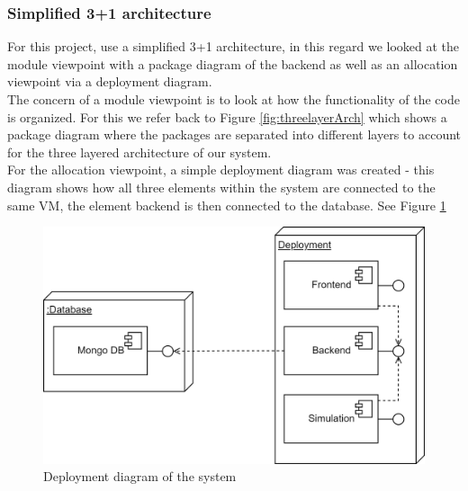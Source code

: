 \subsubsection{Simplified 3+1 architecture}
For this project, use a simplified 3+1 architecture, in this regard we looked at the module viewpoint with a package diagram of the backend as well as an allocation viewpoint via a deployment diagram.\\
The concern of a module viewpoint is to look at how the functionality of the code is organized. For this we refer back to Figure \ref{fig:threelayerArch} which shows a package diagram where the packages are separated into different layers to account for the three layered architecture of our system.\\
For the allocation viewpoint, a simple deployment diagram was created - this diagram shows how all three elements within the system are connected to the same VM, the element backend is then connected to the database. See Figure \ref{fig:deploymentDiagram}
\begin{figure}[h]
    \centering
    \includegraphics[width =.7 \textwidth]{images/DeploymentDiagram.png}
    \caption{Deployment diagram of the system}
    \label{fig:deploymentDiagram}
\end{figure}
